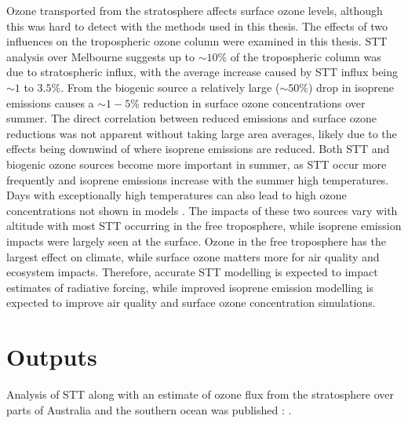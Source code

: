   Ozone transported from the stratosphere affects surface ozone levels, although this was hard to detect with the methods used in this thesis.
  The effects of two influences on the tropospheric ozone column were examined in this thesis.
  STT analysis over Melbourne suggests up to $\sim 10\%$ of the tropospheric column was due to stratospheric influx, with the average increase caused by STT influx being $\sim 1$ to $3.5\%$.
  From the biogenic source a relatively large ($\sim{50}\%$) drop in isoprene emissions causes a $\sim{1-5}\%$ reduction in surface ozone concentrations over summer.
  The direct correlation between reduced emissions and surface ozone reductions was not apparent without taking large area averages, likely due to the effects being downwind of where isoprene emissions are reduced.
  Both STT and biogenic ozone sources become more important in summer, as STT occur more frequently and isoprene emissions increase with the summer high temperatures.
  Days with exceptionally high temperatures can also lead to high ozone concentrations not shown in models \parencite[e.g.,][]{PatonWalsh2018}.
  The impacts of these two sources vary with altitude with most STT occurring in the free troposphere, while isoprene emission impacts were largely seen at the surface.
  Ozone in the free troposphere has the largest effect on climate, while surface ozone matters more for air quality and ecosystem impacts.
  Therefore, accurate STT modelling is expected to impact estimates of radiative forcing, while improved isoprene emission modelling is expected to improve air quality and surface ozone concentration simulations.
  

  
  
\section{Outputs}
  \label{Conclusions:outputs}
  
  Analysis of STT along with an estimate of ozone flux from the stratosphere over parts of Australia and the southern ocean was published : .
  
